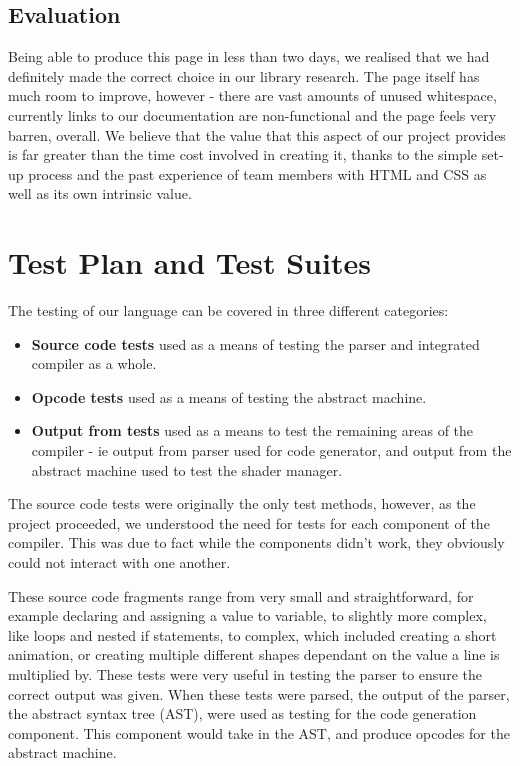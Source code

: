 \documentclass{l3proj}
\begin{document}
\section{Evaluation}
\label{ide-eval}
Being able to produce this page in less than two days, we realised that we had definitely made the correct choice in our library research. The page itself has much room to improve, however - there are vast amounts of unused whitespace, currently links to our documentation are non-functional and the page feels very barren, overall. We believe that the value that this aspect of our project provides is far greater than the time cost involved in creating it, thanks to the simple set-up process and the past experience of team members with HTML and CSS as well as its own intrinsic value.
\chapter{Test Plan and Test Suites}
\label{test}
The testing of our language can be covered in three different categories:
\begin{itemize}
\item \textbf{Source code tests} used as a means of testing the parser and integrated compiler as a whole.
\item \textbf{Opcode tests} used as a means of testing the abstract machine.
\item \textbf{Output from tests} used as a means to test the remaining areas of the compiler - ie output from parser used for code generator, and output from the abstract machine used to test the shader manager.
\end{itemize}
The source code tests were originally the only test methods, however, as the project proceeded, we understood the need for tests for each component of the compiler. This was due to fact while the components didn't work, they obviously could not interact with one another.

These source code fragments range from very small and straightforward, for example declaring and assigning a value to variable, to slightly more complex, like loops and nested if statements, to complex, which included creating a short animation, or creating multiple different shapes dependant on the value a line is multiplied by. These tests were very useful in testing the parser to ensure the correct output was given. When these tests were parsed, the output of the parser, the abstract syntax tree (AST), were used as testing for the code generation component. This component would take in the AST, and produce opcodes for the abstract machine.
\end{document}
